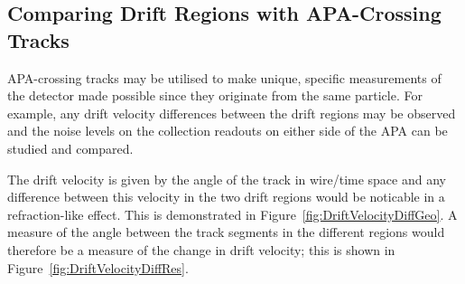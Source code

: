 \subsection{Comparing Drift Regions with APA-Crossing Tracks}\label{sec:APACrossingDriftComparison}

APA-crossing tracks may be utilised to make unique, specific measurements of the detector made possible since they originate from the same particle.  For example, any drift velocity differences between the drift regions may be observed and the noise levels on the collection readouts on either side of the APA can be studied and compared.

The drift velocity is given by the angle of the track in wire/time space and any difference between this velocity in the two drift regions would be noticable in a refraction-like effect.  This is demonstrated in Figure~\ref{fig:DriftVelocityDiffGeo}.  A measure of the angle between the track segments in the different regions would therefore be a measure of the change in drift velocity; this is shown in Figure~\ref{fig:DriftVelocityDiffRes}.

